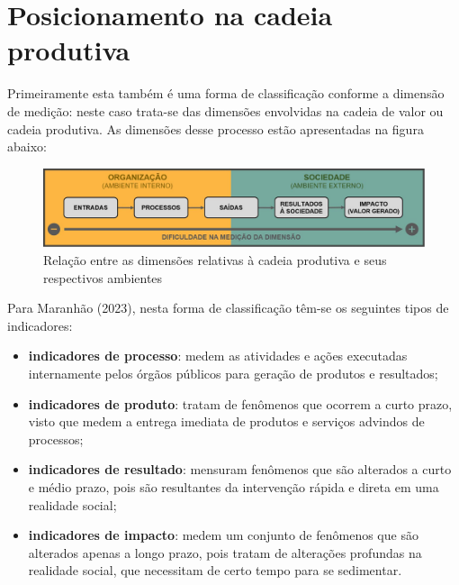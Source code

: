 \documentclass[
  letterpaper,
  DIV=11,
  numbers=noendperiod]{scrreprt}
\begin{document}
\hypertarget{posicionamento-na-cadeia-produtiva}{%
\section{Posicionamento na cadeia
produtiva}\label{posicionamento-na-cadeia-produtiva}}

Primeiramente esta também é uma forma de classificação conforme a
dimensão de medição: neste caso trata-se das dimensões envolvidas na
cadeia de valor ou cadeia produtiva. As dimensões desse processo estão
apresentadas na figura abaixo:

\begin{figure}

{\centering \includegraphics{images/dimensoes_cadeia_prodXambiente.JPG}

}

\caption{Relação entre as dimensões relativas à cadeia produtiva e seus
respectivos ambientes}

\end{figure}

Para Maranhão (2023), nesta forma de classificação têm-se os seguintes
tipos de indicadores:

\begin{itemize}
\item
  \textbf{indicadores de processo}: medem as atividades e ações
  executadas internamente pelos órgãos públicos para geração de produtos
  e resultados;
\item
  \textbf{indicadores de produto}: tratam de fenômenos que ocorrem a
  curto prazo, visto que medem a entrega imediata de produtos e serviços
  advindos de processos;
\item
  \textbf{indicadores de resultado}: mensuram fenômenos que são
  alterados a curto e médio prazo, pois são resultantes da intervenção
  rápida e direta em uma realidade social;
\item
  \textbf{indicadores de impacto}: medem um conjunto de fenômenos que
  são alterados apenas a longo prazo, pois tratam de alterações
  profundas na realidade social, que necessitam de certo tempo para se
  sedimentar.
\end{itemize}
\end{document}
